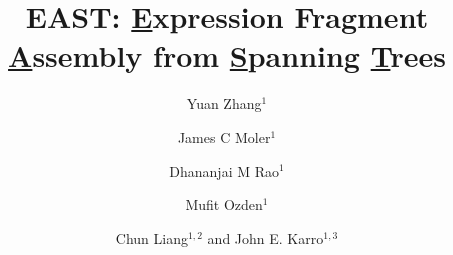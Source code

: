 \documentclass[10pt]{bmc_article}
\newenvironment{bmcformat}{\begin{raggedright}\baselineskip20pt\sloppy\setboolean{publ}{false}}{\end{raggedright}\baselineskip20pt\sloppy}
\begin{document}
\begin{bmcformat}

\title{EAST: {\underline E}xpression Fragment {\underline A}ssembly from {\underline S}panning {\underline T}rees}



\author{Yuan Zhang$^1$
  \and
  James C Moler$^1$
  \and
  Dhananjai M Rao$^1$
  \and
  Mufit Ozden$^1$
  \and
  Chun Liang\correspondingauthor$^{1,2}$
  and
  John E. Karro\correspondingauthor$^{1,3}$
}


\address{
    \iid(1)Department of Computer Science and Software Engineering, Miami University, Oxford OHIO, USA \\
    \iid(2)Department of Botanty, Miami University, Oxford OHIO, USA \\
    \iid(3)Department of Microbiology, Miami University, Oxford OHIO, USA
}

\maketitle




\end{bmcformat}
\end{document}
